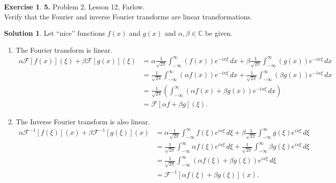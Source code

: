 \documentclass{article}
\theoremstyle{definition}
\newtheorem*{exer*}{Exercise}
\newtheorem*{sln*}{Solution}
\newcommand{\C}{\mathbb{C}}
\newcommand{\F}{\mathcal{F}}
\newcommand{\al}{\alpha}
\newcommand{\f}[2]{\frac{#1}{#2}}
\newcommand{\lp}{\left(}
\newcommand{\rp}{\right)}
\begin{document}
\begin{exer*}\textbf{5. }Problem 2, Lesson 12, Farlow.\\
	
	Verify that the Fourier and inverse Fourier transforms are linear transformations.
	
	\begin{sln*}
		Let ``nice'' functions $f(x)$ and $g(x)$ and $\alpha,\beta \in \C$ be given. \begin{enumerate}
			\item The Fourier transform is linear.
			\begin{align*}
			\alpha\F[ f(x)](\xi) + \beta\F[ g(x)](\xi) &= \alpha\f{1}{\sqrt{2\pi}}\int^\infty_{-\infty} ( f(x))e^{-ix\xi}\,dx + \beta\f{1}{\sqrt{2\pi}} \int^\infty_{-\infty} ( g(x))e^{-ix\xi}\,dx\\
			&=\f{1}{\sqrt{2\pi}}\int^\infty_{-\infty} (\alpha f(x))e^{-ix\xi}\,dx + \f{1}{\sqrt{2\pi}} \int^\infty_{-\infty} (\beta g(x))e^{-ix\xi}\,dx\\
			&= \f{1}{\sqrt{2\pi}}\lp \int^\infty_{-\infty}(\alpha f(x) + \beta g(x)) e^{-ix\xi}\,dx \rp\\
			&= \F[\alpha f + \beta g](\xi).  
			\end{align*}
			
			
			\item The Inverse Fourier transform is also linear.
			\begin{align*}
			\alpha \F^{-1}[f(\xi)](x) + \beta \F^{-1}[g(\xi)](x) &= \al \f{1}{\sqrt{2\pi}}\int^\infty_{-\infty} f(\xi)e^{ix\xi}\,d\xi + \beta \f{1}{\sqrt{2\pi}}\int^\infty_{-\infty} g(\xi) e^{ix\xi}\,d\xi\\
			&= \f{1}{\sqrt{2\pi}}\int^\infty_{-\infty} \al f(\xi)e^{ix\xi}\,d\xi +  \f{1}{\sqrt{2\pi}}\int^\infty_{-\infty} \beta g(\xi) e^{ix\xi}\,d\xi\\
			&= \f{1}{\sqrt{2\pi}}\int^\infty_{-\infty} (\alpha f(\xi) + \beta g(\xi)) e^{ix\xi}\,d\xi\\
			&= \F^{-1}[\alpha f(\xi) + \beta g(\xi)](x).
			\end{align*}
		\end{enumerate}	
	\end{sln*}
\end{exer*}

\newpage
\end{document}
